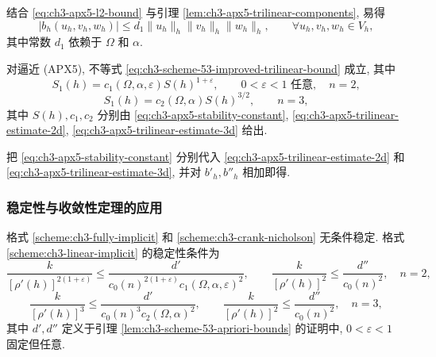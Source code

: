 结合 \eqref{eq:ch3-apx5-l2-bound} 与引理 \ref{lem:ch3-apx5-trilinear-components}, 易得
\begin{equation}
|b_h(u_h,v_h,w_h)|\leq d_1\lVert u_h\rVert_h\lVert v_h\rVert_h\lVert w_h\rVert_h,
\qquad\forall u_h,v_h,w_h\in V_h,
\label{eq:ch3-apx5-bh-continuity}
\end{equation}
其中常数 $d_1$ 依赖于 $\Omega$ 和 $\alpha$.

\hypertarget{chapter-03-page-275}{}
\begin{Proposition}
\label{prop:ch3-apx5-s1-bound}
对逼近 (APX5), 不等式 \eqref{eq:ch3-scheme-53-improved-trilinear-bound} 成立, 其中
\begin{equation}
S_1(h)=c_1(\Omega,\alpha,\varepsilon)S(h)^{1+\varepsilon},
\qquad0<\varepsilon<1\text{ 任意},\quad n=2,
\label{eq:ch3-apx5-s1-2d}
\end{equation}
\begin{equation}
S_1(h)=c_2(\Omega,\alpha)S(h)^{3/2},
\qquad n=3,
\label{eq:ch3-apx5-s1-3d}
\end{equation}
其中 $S(h),c_1,c_2$ 分别由 \eqref{eq:ch3-apx5-stability-constant}, \eqref{eq:ch3-apx5-trilinear-estimate-2d}, \eqref{eq:ch3-apx5-trilinear-estimate-3d} 给出.
\end{Proposition}

\begin{Proof}
把 \eqref{eq:ch3-apx5-stability-constant} 分别代入 \eqref{eq:ch3-apx5-trilinear-estimate-2d} 和 \eqref{eq:ch3-apx5-trilinear-estimate-3d}, 并对 $b'_h,b''_h$ 相加即得.
\end{Proof}

\subsubsection{稳定性与收敛性定理的应用}
格式 \ref{scheme:ch3-fully-implicit} 和 \ref{scheme:ch3-crank-nicholson} 无条件稳定. 格式 \ref{scheme:ch3-linear-implicit} 的稳定性条件为
\begin{equation}
\frac{k}{[\rho'(h)]^{2(1+\varepsilon)}}
\leq\frac{d'}{c_0(n)^{2(1+\varepsilon)}c_1(\Omega,\alpha,\varepsilon)^2},
\qquad
\frac{k}{[\rho'(h)]^2}\leq\frac{d''}{c_0(n)^2},
\quad n=2,
\label{eq:ch3-apx5-scheme53-stability-2d}
\end{equation}
\begin{equation}
\frac{k}{[\rho'(h)]^3}\leq\frac{d'}{c_0(n)^3c_2(\Omega,\alpha)^2},
\qquad
\frac{k}{[\rho'(h)]^2}\leq\frac{d''}{c_0(n)^2},
\quad n=3,
\label{eq:ch3-apx5-scheme53-stability-3d}
\end{equation}
其中 $d',d''$ 定义于引理 \ref{lem:ch3-scheme-53-apriori-bounds} 的证明中, $0<\varepsilon<1$ 固定但任意.

